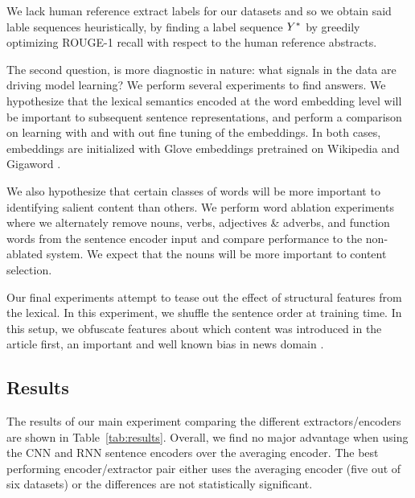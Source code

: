  We lack human reference extract labels for our datasets and so we obtain
 said lable sequences heuristically, by finding a label sequence $Y^*$
 by greedily optimizing ROUGE-1 recall with respect to the human reference
 abstracts.

 The second question, is more diagnostic in nature: what signals
 in the data are driving model learning?
 We perform several experiments to find answers. 
 We hypothesize that the lexical semantics encoded at the word embedding
 level will be important to subsequent sentence representations, and
 perform a comparison on learning with and with out fine tuning of the 
 embeddings. In both cases, embeddings are initialized with Glove
 embeddings pretrained on Wikipedia and Gigaword \citep{glove}.
 
 
 We also hypothesize that certain classes of words will be more important 
 to identifying salient content than others. We perform word ablation 
 experiments where we alternately remove nouns, verbs, adjectives \& adverbs,
 and function words from the sentence encoder input and compare performance 
 to the non-ablated system. We expect that the nouns will be more important
 to content selection. 


 Our final experiments attempt to tease out the effect of structural features 
 from the lexical. In this experiment, we shuffle the sentence order at 
 training time. In this setup, we obfuscate features about which content 
 was introduced in the article first, an important and well known bias in 
 news domain \cite{leadbias}. 


 \subsection{Results}


  

The results of our main experiment comparing 
the different extractors/encoders are shown in 
Table~\ref{tab:results}.
Overall, we find no major advantage when using the CNN and RNN sentence
encoders over the averaging encoder. The best performing encoder/extractor pair either 
uses the averaging 
encoder (five out of six datasets) or the differences 
are not statistically significant. %

